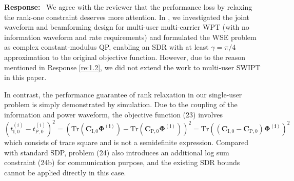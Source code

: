 \documentclass{article}
\newcounter{reviewer}
\newcounter{response}[reviewer]
\newenvironment{response}
	{\refstepcounter{response} \medskip \noindent \textbf{Response:}\ }
	{\medskip}
\begin{document}
\begin{reviewersection}
		\begin{response}
			We agree with the reviewer that the performance loss by relaxing the rank-one constraint deserves more attention. In \cite{Feng2021}, we investigated the joint waveform and beamforming design for multi-user multi-carrier WPT (with no information waveform and rate requirements) and formulated the WSE problem as complex constant-modulus QP, enabling an SDR with at least $\gamma = \pi / 4$ approximation to the original objective function. However, due to the reason mentioned in Response \ref{re:1.2}, we did not extend the work to multi-user SWIPT in this paper.

			In contrast, the performance guarantee of rank relaxation in our single-user problem is simply demonstrated by simulation. Due to the coupling of the information and power waveform, the objective function (23) involves
			\begin{equation}
				(t_{\mathrm{I},0}^{(i)} - t_{\mathrm{P},0}^{(i)})^2 = \left(\mathrm{Tr}(\boldsymbol{C}_{\mathrm{I},0}\boldsymbol{\Phi^{(i)}}) - \mathrm{Tr}(\boldsymbol{C}_{\mathrm{P},0}\boldsymbol{\Phi^{(i)}})\right)^2 = \mathrm{Tr}\left((\boldsymbol{C}_{\mathrm{I},0} - \boldsymbol{C}_{\mathrm{P},0}) \boldsymbol{\Phi^{(i)}}\right)^2
			\end{equation}
			which consists of trace square and is not a semidefinite expression. Compared with standard SDP, problem (24) also introduces an additional log sum constraint (24b) for communication purpose, and the existing SDR bounds cannot be applied directly in this case.
			\label{re:1.5}
		\end{response}
	\end{reviewersection}
\end{document}
